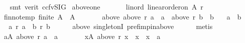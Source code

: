 \begin{isabellebody}
\ \ \ \ \isamarkupfalse%
\ {\isacharparenleft}{\kern0pt}smt\ {\isacharparenleft}{\kern0pt}verit{\isacharcomma}{\kern0pt}\ ccfv{\isacharunderscore}{\kern0pt}SIG{\isacharparenright}{\kern0pt}{\isacharparenright}{\kern0pt}\isanewline
{}\isamarkupfalse%
%
\endisatagproof
{\isafoldproof}%
%
\isadelimproof
\isanewline
%
\endisadelimproof
\isanewline
{}\isamarkupfalse%
\ above{\isacharunderscore}{\kern0pt}one{}{\isacharcolon}{\kern0pt}\isanewline
\ \ \isanewline
\ \ \ \ lin{\isacharunderscore}{\kern0pt}ord{\isacharcolon}{\kern0pt}\ {\isachardoublequoteopen}linear{\isacharunderscore}{\kern0pt}order{\isacharunderscore}{\kern0pt}on\ A\ r{\isachardoublequoteclose}\ \isanewline
\ \ \ \ fin{\isacharunderscore}{\kern0pt}not{\isacharunderscore}{\kern0pt}emp{\isacharcolon}{\kern0pt}\ {\isachardoublequoteopen}finite\ A\ {\isasymand}\ A\ {\isasymnoteq}\ {\isacharbraceleft}{\kern0pt}{\isacharbraceright}{\kern0pt}{\isachardoublequoteclose}\ \isanewline
\ \ \ \ above{}{\isacharcolon}{\kern0pt}\ {\isachardoublequoteopen}above\ r\ a\ {\isacharequal}{\kern0pt}\ {\isacharbraceleft}{\kern0pt}a{\isacharbraceright}{\kern0pt}\ {\isasymand}\ above\ r\ b\ {\isacharequal}{\kern0pt}\ {\isacharbraceleft}{\kern0pt}b{\isacharbraceright}{\kern0pt}{\isachardoublequoteclose}\isanewline
\ \ \ {\isachardoublequoteopen}a\ {\isacharequal}{\kern0pt}\ b{\isachardoublequoteclose}\isanewline
%
\isadelimproof
%
\endisadelimproof
%
\isatagproof
{}\isamarkupfalse%
\ {\isacharminus}{\kern0pt}\isanewline
\ \ \isamarkupfalse%
\ {\isachardoublequoteopen}a\ {\isasympreceq}\isactrlsub r\ a\ {\isasymand}\ b\ {\isasympreceq}\isactrlsub r\ b{\isachardoublequoteclose}\isanewline
\ \ \ \ \isamarkupfalse%
\ above{}\ singletonI\ pref{\isacharunderscore}{\kern0pt}imp{\isacharunderscore}{\kern0pt}in{\isacharunderscore}{\kern0pt}above\isanewline
\ \ \ \ \isamarkupfalse%
\ metis\isanewline
\ \ \isamarkupfalse%
\ \isamarkupfalse%
\isanewline
\ \ \ \ {\isachardoublequoteopen}{\isasymexists}a{\isasymin}A{\isachardot}{\kern0pt}\ above\ r\ a\ {\isacharequal}{\kern0pt}\ {\isacharbraceleft}{\kern0pt}a{\isacharbraceright}{\kern0pt}\ {\isasymand}\isanewline
\ \ \ \ \ \ {\isacharparenleft}{\kern0pt}{\isasymforall}x{\isasymin}A{\isachardot}{\kern0pt}\ above\ r\ x\ {\isacharequal}{\kern0pt}\ {\isacharbraceleft}{\kern0pt}x{\isacharbraceright}{\kern0pt}\ {\isasymlongrightarrow}\ x\ {\isacharequal}{\kern0pt}\ a{\isacharparenright}{\kern0pt}{\isachardoublequoteclose}\isanewline

\end{isabellebody}
